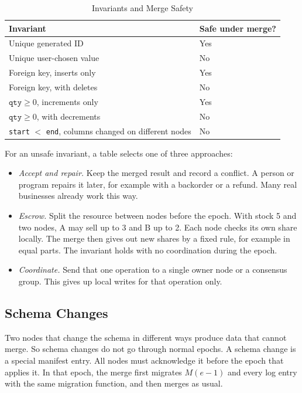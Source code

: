 \documentclass[journal]{IEEEtran}
\begin{document}
\begin{table}[t]
\caption{Invariants and Merge Safety}\label{tab:iconf}
\centering\small
\begin{tabular}{@{}L{5.6cm}l@{}}
\toprule
Invariant & Safe under merge?\\
\midrule
Unique generated ID & Yes\\
Unique user-chosen value & No\\
Foreign key, inserts only & Yes\\
Foreign key, with deletes & No\\
$\texttt{qty}\ge 0$, increments only & Yes\\
$\texttt{qty}\ge 0$, with decrements & No\\
\texttt{start} $<$ \texttt{end}, columns changed on different nodes & No\\
\bottomrule
\end{tabular}
\end{table}

For an unsafe invariant, a table selects one of three approaches:
\begin{itemize}
\item \emph{Accept and repair.} Keep the merged result and record a conflict. A person or program repairs it later, for example with a backorder or a refund. Many real businesses already work this way.
\item \emph{Escrow.} Split the resource between nodes before the epoch. With stock 5 and two nodes, A may sell up to 3 and B up to 2. Each node checks its own share locally. The merge then gives out new shares by a fixed rule, for example in equal parts. The invariant holds with no coordination during the epoch.
\item \emph{Coordinate.} Send that one operation to a single owner node or a consensus group. This gives up local writes for that operation only.
\end{itemize}

\subsection{Schema Changes}\label{sec:schema}
Two nodes that change the schema in different ways produce data that cannot merge. So schema changes do not go through normal epochs. A schema change is a special manifest entry. All nodes must acknowledge it before the epoch that applies it. In that epoch, the merge first migrates $M(e{-}1)$ and every log entry with the same migration function, and then merges as usual.
\end{document}
